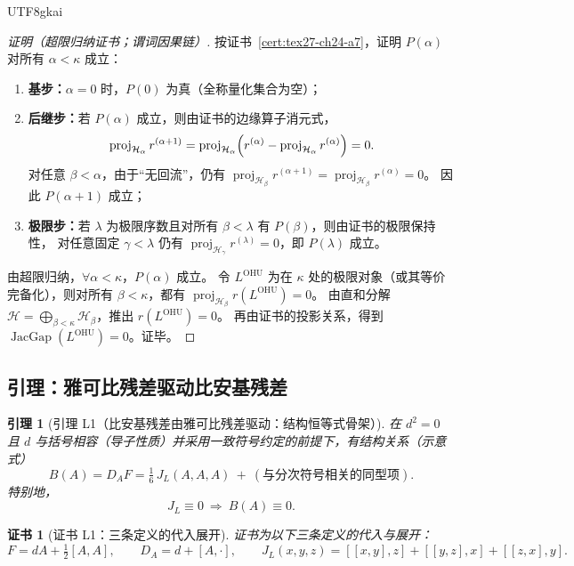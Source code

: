 \documentclass[12pt]{article}
\newtheorem{lemma}{引理}[section]
\newtheorem{Certificate}{证书}[section]
\newcommand{\JacGap}{\operatorname{JacGap}}
\begin{document}
\begin{CJK*}{UTF8}{gkai}
\begin{proof}[证明（超限归纳证书；谓词因果链）]
按证书~\ref{cert:tex27-ch24-a7}，证明 $P(\alpha)$ 对所有 $\alpha<\kappa$ 成立：
\begin{enumerate}
  \item \textbf{基步：}$\alpha=0$ 时，$P(0)$ 为真（全称量化集合为空）；
  \item \textbf{后继步：}若 $P(\alpha)$ 成立，则由证书的边缘算子消元式，
  \[
    \operatorname{proj}_{\mathcal{H}_\alpha} r^{(\alpha+1)}
    =
    \operatorname{proj}_{\mathcal{H}_\alpha}\Bigl(r^{(\alpha)}-\operatorname{proj}_{\mathcal{H}_\alpha} r^{(\alpha)}
      \Bigr)=0.
  \]
  对任意 $\beta<\alpha$，由于“无回流”，仍有
  $\operatorname{proj}_{\mathcal{H}_\beta} r^{(\alpha+1)}=\operatorname{proj}_{\mathcal{H}_\beta} r^{(\alpha)}=0$。
  因此 $P(\alpha+1)$ 成立；
  \item \textbf{极限步：}若 $\lambda$ 为极限序数且对所有 $\beta<\lambda$ 有 $P(\beta)$，则由证书的极限保持性，
  对任意固定 $\gamma<\lambda$ 仍有 $\operatorname{proj}_{\mathcal{H}_\gamma} r^{(\lambda)}=0$，即 $P(\lambda)$ 成立。
\end{enumerate}
由超限归纳，$\forall \alpha<\kappa$，$P(\alpha)$ 成立。
令 $L^{\mathrm{OHU}}$ 为在 $\kappa$ 处的极限对象（或其等价完备化），则对所有 $\beta<\kappa$，都有
$\operatorname{proj}_{\mathcal{H}_\beta} r(L^{\mathrm{OHU}})=0$。
由直和分解 $\mathcal{H}=\bigoplus_{\beta<\kappa}\mathcal{H}_\beta$，推出 $r(L^{\mathrm{OHU}})=0$。
再由证书的投影关系，得到 $\JacGap(L^{\mathrm{OHU}})=0$。证毕。
\end{proof}

\subsection{引理：雅可比残差驱动比安基残差}
\label{subsec:tex27-ch24-lemma}

\begin{lemma}[引理 L1（比安基残差由雅可比残差驱动：结构恒等式骨架）]
\label{lem:tex27-ch24-l1}
在 $d^2=0$ 且 $d$ 与括号相容（导子性质）并采用一致符号约定的前提下，有结构关系（示意式）
\[
  B(A)=D_A F
  =
  \tfrac16\,J_L(A,A,A)\ +\ (\text{与分次符号相关的同型项}).
\]
特别地，
\[
  J_L\equiv 0\ \Longrightarrow\ B(A)\equiv 0.
\]
\end{lemma}

\begin{Certificate}[证书 L1：三条定义的代入展开]
\label{cert:tex27-ch24-l1}
证书为以下三条定义的代入与展开：
\[
  F=dA+\tfrac12[A,A],\qquad D_A=d+[A,\cdot],\qquad
  J_L(x,y,z)=[[x,y],z]+[[y,z],x]+[[z,x],y].
\]
\end{Certificate}


\end{CJK*}
\end{document}
